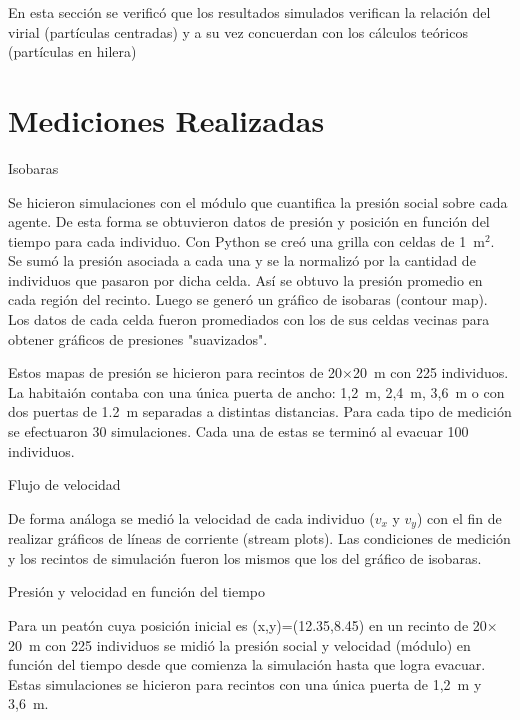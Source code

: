 En esta sección se verificó que los resultados simulados verifican la relación del virial (partículas centradas) y a su vez concuerdan con los cálculos teóricos (partículas en hilera)


\section{\label{med realizadas} Mediciones Realizadas}

{\Large Isobaras}

Se hicieron simulaciones con el módulo que cuantifica la presión social sobre cada agente. De esta
forma se obtuvieron datos de presión y posición en función del tiempo para cada individuo. Con Python se creó una grilla con celdas de 1~m$^2$. Se sumó la presión asociada a cada una y se la normalizó por la cantidad de individuos que pasaron por dicha celda. Así se obtuvo la presión promedio en cada región del recinto. Luego se generó un gráfico de isobaras (contour map). Los datos de cada celda fueron promediados con los de sus celdas vecinas para obtener gráficos de presiones "suavizados".


Estos mapas de presión se hicieron para recintos de 20$\times$20~m con 225 individuos. La habitaión contaba con una única puerta de ancho: 1,2~m, 2,4~m, 3,6~m o con dos puertas de 1.2~m separadas a distintas distancias. Para cada tipo de medición se efectuaron 30 simulaciones. Cada una de estas se terminó al evacuar 100 individuos. 

{\Large Flujo de velocidad}

De forma análoga se medió la velocidad de cada individuo ($v_x$ y $v_y$) con el fin de realizar gráficos de líneas de corriente (stream plots). Las condiciones de medición y los recintos de simulación fueron los mismos que los del gráfico de isobaras. 

{\Large Presión y velocidad en función del tiempo}

Para un peatón cuya posición inicial es (x,y)=(12.35,8.45) en un recinto de 20$\times$20~m con 225 individuos se midió la presión social y velocidad (módulo) en función del tiempo desde que comienza la simulación hasta que logra evacuar. Estas simulaciones se hicieron para recintos con una única puerta de 1,2~m y 3,6~m. 

